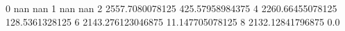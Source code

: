 0 nan nan
1 nan nan
2 2557.7080078125 425.57958984375
4 2260.66455078125 128.5361328125
6 2143.276123046875 11.147705078125
8 2132.12841796875 0.0
